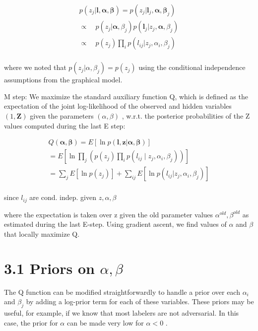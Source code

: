 \documentclass[
]{article}
\begin{document}
\[
\begin{array}{l} p (z _ {j} | \mathbf {l}, \boldsymbol {\alpha}, \boldsymbol {\beta}) = p (z _ {j} | \mathbf {l} _ {j}, \boldsymbol {\alpha}, \boldsymbol {\beta} _ {j}) \\ \propto \quad p (z _ {j} | \boldsymbol {\alpha}, \beta_ {j}) p (\mathbf {l} _ {j} | z _ {j}, \boldsymbol {\alpha}, \beta_ {j}) \\ \propto \quad p (z _ {j}) \prod_ {i} p (l _ {i j} | z _ {j}, \alpha_ {i}, \beta_ {j}) \\ \end{array}
\]

where we noted that \(p(z_{j}|\alpha, \beta_{j}) = p(z_{j})\) using the
conditional independence assumptions from the graphical model.

M step: We maximize the standard auxiliary function Q, which is defined
as the expectation of the joint log-likelihood of the observed and
hidden variables \((1, \mathbf{Z})\) given the parameters
\((\alpha, \beta)\) , w.r.t. the posterior probabilities of the Z values
computed during the last E step:

\[
\begin{array}{l} Q (\boldsymbol {\alpha}, \boldsymbol {\beta}) = E [ \ln p (\mathbf {l}, \mathbf {z} | \boldsymbol {\alpha}, \boldsymbol {\beta}) ] \\ = E \left[ \ln \prod_ {j} \left(p \left(z _ {j}\right) \prod_ {i} p \left(l _ {i j} \mid z _ {j}, \alpha_ {i}, \beta_ {j}\right)\right) \right] \\ = \sum_ {j} E [ \ln p (z _ {j}) ] + \sum_ {i j} E [ \ln p (l _ {i j} | z _ {j}, \alpha_ {i}, \beta_ {j}) ] \\ \end{array}
\]

since \(l_{ij}\) are cond. indep. given \(z, \alpha, \beta\)

where the expectation is taken over z given the old parameter values
\(\alpha^{old}, \beta^{old}\) as estimated during the last E-step. Using
gradient ascent, we find values of \(\alpha\) and \(\beta\) that locally
maximize Q.

\section{\texorpdfstring{3.1 Priors on
\(\alpha, \beta\)}{3.1 Priors on \textbackslash alpha, \textbackslash beta}}\label{priors-on-alpha-beta}

The Q function can be modified straightforwardly to handle a prior over
each \(\alpha_{i}\) and \(\beta_{j}\) by adding a log-prior term for
each of these variables. These priors may be useful, for example, if we
know that most labelers are not adversarial. In this case, the prior for
\(\alpha\) can be made very low for \(\alpha < 0\) .
\end{document}

